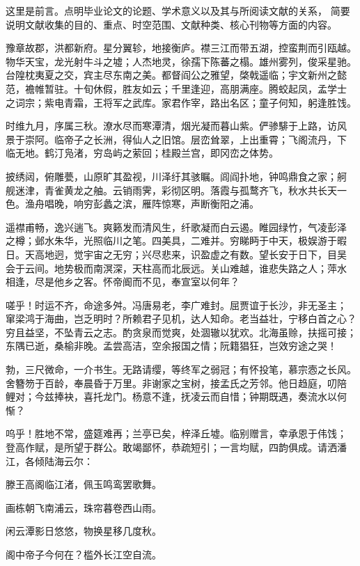 \begin{foreword}
这里是前言。点明毕业论文的论题、学术意义以及其与所阅读文献的关系，
简要说明文献收集的目的、重点、时空范围、文献种类、核心刊物等方面的内容。

豫章故郡，洪都新府。星分翼轸，地接衡庐。襟三江而带五湖，控蛮荆而引瓯越。
物华天宝，龙光射牛斗之墟；人杰地灵，徐孺下陈蕃之榻。雄州雾列，俊采星驰。
台隍枕夷夏之交，宾主尽东南之美。都督阎公之雅望，棨戟遥临；宇文新州之懿
范，襜帷暂驻。十旬休假，胜友如云；千里逢迎，高朋满座。腾蛟起凤，孟学士
之词宗；紫电青霜，王将军之武库。家君作宰，路出名区；童子何知，躬逢胜饯。

时维九月，序属三秋。潦水尽而寒潭清，烟光凝而暮山紫。俨骖騑于上路，访风
景于崇阿。临帝子之长洲，得仙人之旧馆。层峦耸翠，上出重霄；飞阁流丹，下
临无地。鹤汀凫渚，穷岛屿之萦回；桂殿兰宫，即冈峦之体势。

披绣闼，俯雕甍，山原旷其盈视，川泽纡其骇瞩。闾阎扑地，钟鸣鼎食之家；舸
舰迷津，青雀黄龙之舳。云销雨霁，彩彻区明。落霞与孤鹜齐飞，秋水共长天一
色。渔舟唱晚，响穷彭蠡之滨，雁阵惊寒，声断衡阳之浦。

遥襟甫畅，逸兴遄飞。爽籁发而清风生，纤歌凝而白云遏。睢园绿竹，气凌彭泽
之樽；邺水朱华，光照临川之笔。四美具，二难并。穷睇眄于中天，极娱游于暇
日。天高地迥，觉宇宙之无穷；兴尽悲来，识盈虚之有数。望长安于日下，目吴
会于云间。地势极而南溟深，天柱高而北辰远。关山难越，谁悲失路之人；萍水
相逢，尽是他乡之客。怀帝阍而不见，奉宣室以何年？

嗟乎！时运不齐，命途多舛。冯唐易老，李广难封。屈贾谊于长沙，非无圣主；
窜梁鸿于海曲，岂乏明时？所赖君子见机，达人知命。老当益壮，宁移白首之心？
穷且益坚，不坠青云之志。酌贪泉而觉爽，处涸辙以犹欢。北海虽赊，扶摇可接；
东隅已逝，桑榆非晚。孟尝高洁，空余报国之情；阮籍猖狂，岂效穷途之哭！

勃，三尺微命，一介书生。无路请缨，等终军之弱冠；有怀投笔，慕宗悫之长风。
舍簪笏于百龄，奉晨昏于万里。非谢家之宝树，接孟氏之芳邻。他日趋庭，叨陪
鲤对；今兹捧袂，喜托龙门。杨意不逢，抚凌云而自惜；钟期既遇，奏流水以何惭？

呜乎！胜地不常，盛筵难再；兰亭已矣，梓泽丘墟。临别赠言，幸承恩于伟饯；
登高作赋，是所望于群公。敢竭鄙怀，恭疏短引；一言均赋，四韵俱成。请洒潘
江，各倾陆海云尔：

\begin{center}
滕王高阁临江渚，佩玉鸣鸾罢歌舞。

画栋朝飞南浦云，珠帘暮卷西山雨。

闲云潭影日悠悠，物换星移几度秋。

阁中帝子今何在？槛外长江空自流。
\end{center}

\end{foreword}

